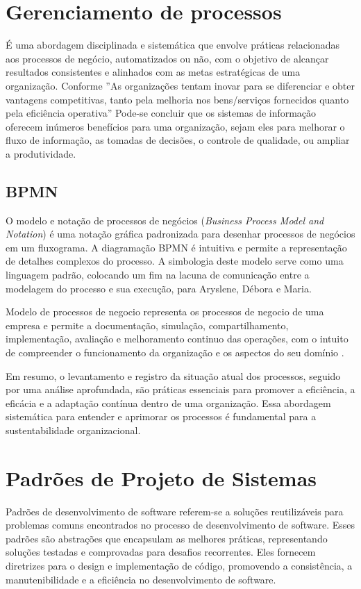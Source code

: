 \section{Gerenciamento de processos}
É uma abordagem disciplinada e sistemática que envolve práticas relacionadas aos processos de negócio, automatizados ou não, com o objetivo de alcançar resultados consistentes e alinhados com as metas estratégicas de uma organização. 
Conforme \cite{davila2008inovaccao}''As organizações tentam inovar para se diferenciar e obter vantagens competitivas, tanto pela melhoria nos bens/serviços fornecidos quanto pela eficiência operativa''
 Pode-se concluir que os sistemas de informação oferecem inúmeros benefícios para uma organização, sejam eles para melhorar o fluxo de informação, as tomadas de decisões, o controle de qualidade, ou ampliar a produtividade.
\subsection{BPMN}
O modelo e notação de processos de negócios (\textit{Business Process Model and Notation}) é uma notação gráfica padronizada para desenhar processos de negócios em um fluxograma. A diagramação BPMN é intuitiva e permite a representação de detalhes complexos do processo. A simbologia deste modelo serve como uma linguagem padrão, colocando um fim na lacuna de comunicação entre a modelagem do processo e sua execução, para Aryslene, Débora e Maria.
\begin{citacao}
	
	Modelo de processos de negocio representa os processos de negocio de uma empresa e permite a documentação, simulação, compartilhamento, implementação, avaliação e melhoramento continuo das operações, com o intuito de compreender o funcionamento da organização e os aspectos do seu domínio \cite{bitencourt2016elicitaccao}.
	
\end{citacao}
Em resumo, o levantamento e registro da situação atual dos processos, seguido por uma análise aprofundada, são práticas essenciais para promover a eficiência, a eficácia e a adaptação contínua dentro de uma organização. Essa abordagem sistemática para entender e aprimorar os processos é fundamental para a sustentabilidade organizacional.

\section{Padrões de Projeto de Sistemas}
Padrões de desenvolvimento de software referem-se a soluções reutilizáveis para problemas comuns encontrados no processo de desenvolvimento de software. Esses padrões são abstrações que encapsulam as melhores práticas, representando soluções testadas e comprovadas para desafios recorrentes. Eles fornecem diretrizes para o design e implementação de código, promovendo a consistência, a manutenibilidade e a eficiência no desenvolvimento de software\cite{padroesProjeto}.

